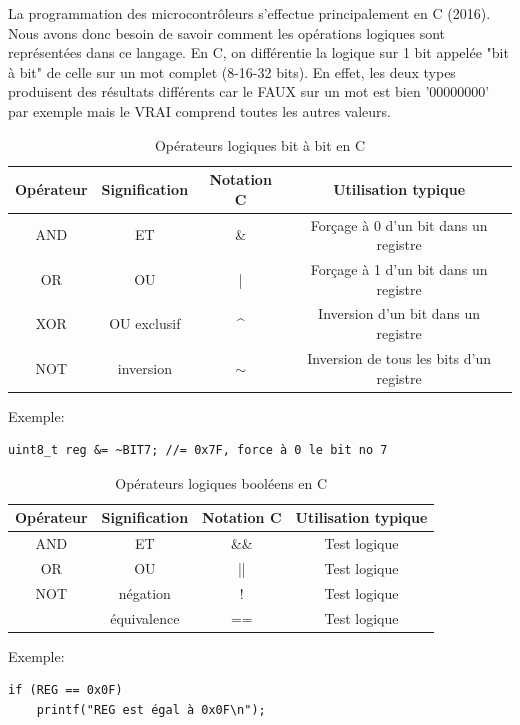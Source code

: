 La programmation des microcontrôleurs s'effectue principalement en C (2016). Nous avons donc besoin de savoir comment les opérations logiques sont représentées dans ce langage. En C, on différentie la logique sur 1 bit appelée "bit à bit" de celle sur un mot complet (8-16-32 bits). En effet, les deux types produisent des résultats différents car le FAUX sur un mot est bien '00000000' par exemple mais le VRAI comprend toutes les autres valeurs.


\begin{table}[!htbp]
\begin{center}
\begin{tabular}{|c|c|c|c|}
\hline
Opérateur & Signification & Notation C & Utilisation typique\\
\hline
AND & ET & \& & Forçage à 0 d'un bit dans un registre\\
OR & OU & | & Forçage à 1 d'un bit dans un registre\\
XOR & OU exclusif & \^{} & Inversion d'un bit dans un registre\\
NOT & inversion & $\sim$ & Inversion de tous les bits d'un registre\\
\hline
\end{tabular}
\end{center}
\caption{Opérateurs logiques bit à bit en C}
\end{table}

Exemple: 
\lstset{style=customc}
\begin{lstlisting}
uint8_t reg &= ~BIT7; //= 0x7F, force à 0 le bit no 7
\end{lstlisting}

\begin{table}[!htbp]
\begin{center}
\begin{tabular}{|c|c|c|c|}
\hline
Opérateur & Signification & Notation C & Utilisation typique\\
\hline
AND & ET & \&\& & Test logique\\
OR & OU & || & Test logique\\
NOT & négation & ! & Test logique\\
 & équivalence & == & Test logique\\
\hline
\end{tabular}
\end{center}
\caption{Opérateurs logiques booléens en C}
\end{table}

Exemple: 
\lstset{style=customc}
\begin{lstlisting}
if (REG == 0x0F)
	printf("REG est égal à 0x0F\n");
\end{lstlisting}

